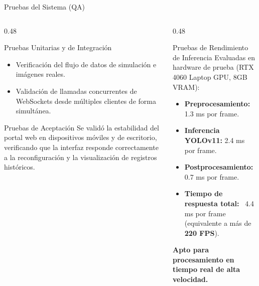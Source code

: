 \documentclass[10pt,aspectratio=169]{beamer}
\begin{document}
\begin{frame}{Pruebas del Sistema (QA)}
  \begin{columns}[T]
    \begin{column}{0.48\textwidth}
      \begin{block}{Pruebas Unitarias y de Integración}
        \small
        \begin{itemize}
          \item Verificación del flujo de datos de simulación e imágenes reales.
          \item Validación de llamadas concurrentes de WebSockets desde múltiples clientes de forma simultánea.
        \end{itemize}
      \end{block}
      \begin{block}{Pruebas de Aceptación}
        \small
        Se validó la estabilidad del portal web en dispositivos móviles y de escritorio, verificando que la interfaz responde correctamente a la reconfiguración y la visualización de registros históricos.
      \end{block}
    \end{column}
    
    \begin{column}{0.48\textwidth}
      \begin{block}{Pruebas de Rendimiento de Inferencia}
        \small
        Evaluadas en hardware de prueba (RTX 4060 Laptop GPU, 8GB VRAM):
        \begin{itemize}
          \scriptsize
          \item \textbf{Preprocesamiento:} 1.3 ms por frame.
          \item \textbf{Inferencia YOLOv11:} 2.4 ms por frame.
          \item \textbf{Postprocesamiento:} 0.7 ms por frame.
          \item \textbf{Tiempo de respuesta total:} ~4.4 ms por frame (equivalente a más de \textbf{220 FPS}).
        \end{itemize}
        
        \vspace{0.1cm}
        \centering \scriptsize \color{successgreen}
        \textbf{Apto para procesamiento en tiempo real de alta velocidad.}
      \end{block}
    \end{column}
  \end{columns}
\end{frame}
\end{document}
